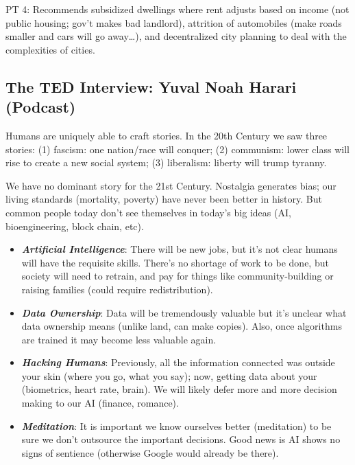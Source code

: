 \documentclass[
]{article}
\begin{document}
PT 4: Recommends subsidized dwellings where rent adjusts based on income
(not public housing; gov't makes bad landlord), attrition of automobiles
(make roads smaller and cars will go away\ldots), and decentralized city
planning to deal with the complexities of cities.

\hypertarget{the-ted-interview-yuval-noah-harari-podcast}{%
\subsection{The TED Interview: Yuval Noah Harari
(Podcast)}\label{the-ted-interview-yuval-noah-harari-podcast}}

Humans are uniquely able to craft stories. In the 20th Century we saw
three stories: (1) fascism: one nation/race will conquer; (2) communism:
lower class will rise to create a new social system; (3) liberalism:
liberty will trump tyranny.

We have no dominant story for the 21st Century. Nostalgia generates
bias; our living standards (mortality, poverty) have never been better
in history. But common people today don't see themselves in today's big
ideas (AI, bioengineering, block chain, etc).

\begin{itemize}
\item
  \textbf{\emph{Artificial Intelligence}}: There will be new jobs, but
  it's not clear humans will have the requisite skills. There's no
  shortage of work to be done, but society will need to retrain, and pay
  for things like community-building or raising families (could require
  redistribution).
\item
  \textbf{\emph{Data Ownership}}: Data will be tremendously valuable but
  it's unclear what data ownership means (unlike land, can make copies).
  Also, once algorithms are trained it may become less valuable again.
\item
  \textbf{\emph{Hacking Humans}}: Previously, all the information
  connected was outside your skin (where you go, what you say); now,
  getting data about your (biometrics, heart rate, brain). We will
  likely defer more and more decision making to our AI (finance,
  romance).
\item
  \textbf{\emph{Meditation}}: It is important we know ourselves better
  (meditation) to be sure we don't outsource the important decisions.
  Good news is AI shows no signs of sentience (otherwise Google would
  already be there).
\end{itemize}
\end{document}
